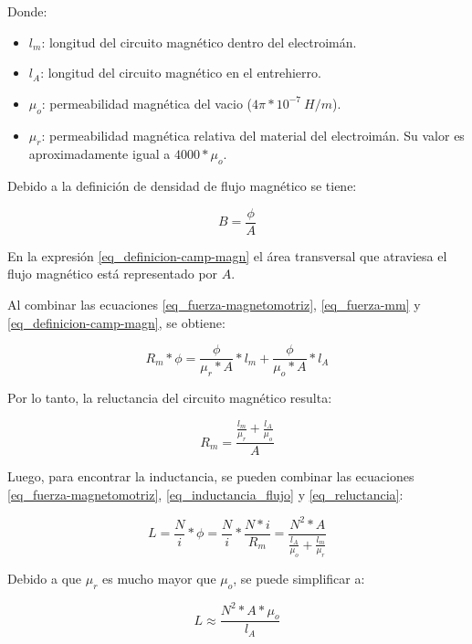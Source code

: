 Donde:
\begin{itemize}
	\item $l_{m}$: longitud del circuito magnético dentro del electroimán.
	\item $l_{A}$: longitud del circuito magnético en el entrehierro.
	\item $\mu_{o}$: permeabilidad magnética del vacio ($4 \pi * 10^{-7}\:H/m$).
	\item $\mu_{r}$: permeabilidad magnética relativa del material del electroimán. Su valor es aproximadamente igual a $4000 * \mu_{o}$.
	
\end{itemize}

\noindent Debido a la definición de  densidad de flujo magnético se tiene:

\begin{equation}\label{eq_definicion-camp-magn}
	B=\frac{\phi}{A}
\end{equation}

En la expresión \ref{eq_definicion-camp-magn} el área transversal que atraviesa el flujo magnético está representado por $A$.

Al combinar las ecuaciones \ref{eq_fuerza-magnetomotriz}, \ref{eq_fuerza-mm} y \ref{eq_definicion-camp-magn}, se obtiene:

\begin{equation}
	R_{m}*\phi=\frac{\phi}{\mu_{r}*A}*l_{m}+\frac{\phi}{\mu_{o}*A}*l_{A}
\end{equation}

Por lo tanto, la reluctancia del circuito magnético resulta:

\begin{equation} \label{eq_reluctancia}
	R_{m}=\frac{\frac{l_{m}}{\mu_{r}}+\frac{l_{A}}{\mu_{o}}}{A}
\end{equation}

\noindent Luego, para encontrar la inductancia, se pueden combinar las ecuaciones  \ref{eq_fuerza-magnetomotriz}, \ref{eq_inductancia_flujo} y \ref{eq_reluctancia}:

\begin{equation}\label{eq_inductancia_2}
	L=\frac{N}{i}*\phi=\frac{N}{i}*\frac{N*i}{R_{m}}=\frac{N^{2}*A}{\frac{l_{A}}{\mu_{o}}+\frac{l_{m}}{\mu_{r}}}
\end{equation}

\noindent Debido a que $\mu_{r}$ es mucho mayor que $\mu_{o}$, se puede simplificar a:

\begin{equation} \label{eq_inductancia_gap}
	L\approx\frac{N^{2}*A*\mu_{o}}{l_{A}}
\end{equation}

